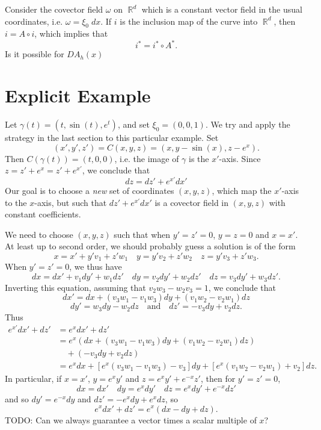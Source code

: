 \documentclass[dvipsnames,letterpaper,12pt]{article}
\DeclareMathOperator{\RR}{\mathbb{R}}
\begin{document}
Consider the covector field $\omega$ on $\RR^d$ which is a constant vector field in the usual coordinates, i.e. $\omega = \xi_0\; dx$. If $i$ is the inclusion map of the curve into $\RR^d$, then $i = A \circ i$, which implies that
%
\[ i^* = i^* \circ A^*. \]
%
Is it possible for $DA_h(x)$

\newpage

\section{Explicit Example}

Let $\gamma(t) = (t, \sin(t), e^t)$, and set $\xi_0 = (0,0,1)$. We try and apply the strategy in the last section to this particular example. Set
%
\[ (x',y',z') = C(x,y,z) = (x, y - \sin(x), z - e^x). \]
%
Then $C(\gamma(t)) = (t,0,0)$, i.e. the image of $\gamma$ is the $x'$-axis. Since $z = z' + e^x = z' + e^{x'}$, we conclude that
%
\[ dz = dz' + e^{x'} dx' \]
%
Our goal is to choose a \emph{new} set of coordinates $(x,y,z)$, which map the $x'$-axis to the $x$-axis, but such that $dz' + e^{x'} dx'$ is a covector field in $(x,y,z)$ with constant coefficients.

We need to choose $(x,y,z)$ such that when $y' = z' = 0$, $y = z = 0$ and $x = x'$. At least up to second order, we should probably guess a solution is of the form
%
\[ x = x' + y' v_1 + z' w_1 \quad y = y' v_2 + z' w_2 \quad z = y' v_3 + z' w_3. \]
%
When $y' = z' = 0$, we thus have
%
\[ dx = dx' + v_1 dy' + w_1 dz' \quad dy = v_2 dy' + w_2 dz' \quad dz = v_3 dy' + w_3 dz'.  \]
%
Inverting this equation, assuming that $v_2 w_3 - w_2 v_3 = 1$, we conclude that
%
\[ dx' = dx + (v_3 w_1 - v_1 w_3) dy + (v_1 w_2 - v_2 w_1) dz \]
%
\[ dy' = w_3 dy - w_2 dz \quad\text{and}\quad dz' = - v_3 dy + v_2 dz. \]
%
Thus
%
\begin{align*}
    e^{x'} dx' + dz' &= e^x dx' + dz'\\
    &= e^x ( dx + (v_3 w_1 - v_1 w_3) dy + (v_1 w_2 - v_2 w_1) dz )\\
    &\quad + (- v_3 dy + v_2 dz)\\
    &= e^x dx + [e^x (v_3 w_1 - v_1 w_3) - v_3 ] dy + [ e^x (v_1 w_2 - v_2 w_1) + v_2 ] dz. 
\end{align*}
%
In particular, if $x = x'$, $y = e^x y'$ and $z = e^x y' + e^{-x} z'$, then for $y' = z' = 0$,
%
\[ dx = dx' \quad dy = e^x dy' \quad dz = e^x dy' + e^{-x} dz' \]
%
and so $dy' = e^{-x} dy$ and $dz' = - e^x dy + e^x dz$, so
%
\[ e^x dx' + dz' = e^x (dx - dy + dz). \]
%
TODO: Can we always guarantee a vector times a scalar multiple of $x$?
\end{document}
